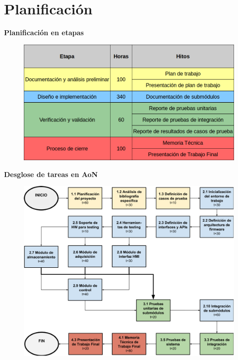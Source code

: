 \documentclass[11pt]{beamer}
\begin{document}
\section{Planificación}


\begin{frame}{\textbf{\LARGE{Planificación en etapas}}}
	\vspace{-.7cm}
	\begin{figure}[H]
		{\includegraphics[width=\textwidth]{./imagenes/planificacion.png}}
	\end{figure}	
\end{frame}

\begin{frame}{\textbf{\LARGE{Desglose de tareas en AoN}}}
	\vspace{-.7cm}
	\begin{figure}[H]
		{\includegraphics[height=.8\textheight]{./imagenes/AoN.pdf}}
	\end{figure}	
\end{frame}
\end{document}
